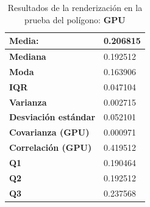 \begin{table}[htp]
\centering


    
    \begin{center}
    \begin{tabular}{ | l | l | }
        
        
        \hline
        \textbf{Media: }  & 0.206815 \\
        \hline
        \textbf{Mediana} & 0.192512 \\
        \hline
        \textbf{Moda} & 0.163906 \\
        \hline
        \textbf{IQR} & 0.047104 \\
        \hline
        \textbf{Varianza} & 0.002715 \\
        \hline
        \textbf{Desviación estándar} & 0.052101 \\
        \hline
        \textbf{Covarianza (GPU)} & 0.000971 \\
        \hline
        \textbf{Correlación (GPU)} & 0.419512 \\
        \hline
        \textbf{Q1} & 0.190464 \\
        \hline
        \textbf{Q2} & 0.192512 \\
        \hline
        \textbf{Q3} & 0.237568 \\
        \hline
        
    \end{tabular} 
    \end{center}
    
    \caption{Resultados de la renderización en la prueba del polígono: \textbf{GPU}}
    
    \label{table:results-animation-render-gpu}
\end{table}